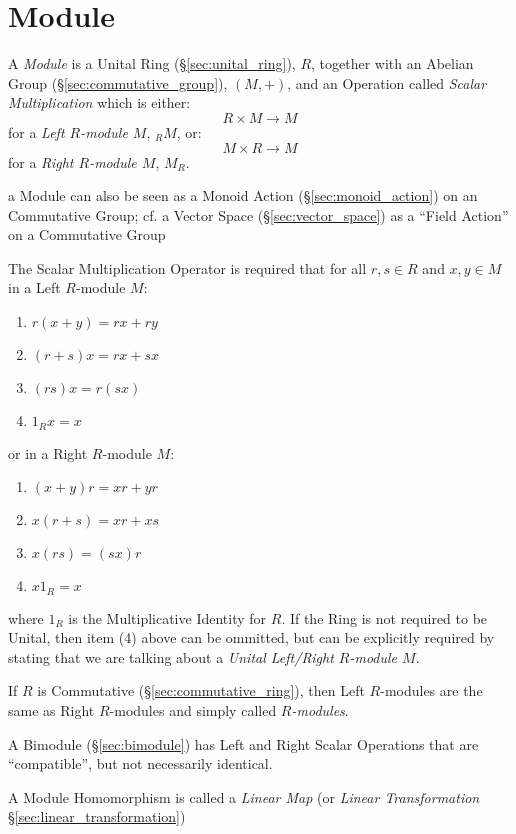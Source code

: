 \section{Module}\label{sec:module}

A \emph{Module} is a Unital Ring (\S\ref{sec:unital_ring}), $R$, together with
an Abelian Group (\S\ref{sec:commutative_group}), $(M, +)$, and an Operation
called \emph{Scalar Multiplication} which is either:
\[ R \times M \rightarrow M \]
for a \emph{Left $R$-module $M$}, $_R M$, or:
\[ M \times R \rightarrow M \]
for a \emph{Right $R$-module $M$}, $M_R$.

a Module can also be seen as a Monoid Action (\S\ref{sec:monoid_action}) on an
Commutative Group;
cf. a Vector Space (\S\ref{sec:vector_space}) as a ``Field Action'' on a
Commutative Group

The Scalar Multiplication Operator is required that for all $r,s \in R$ and
$x,y \in M$ in a Left $R$-module $M$:
\begin{enumerate}
    \item $r(x + y) = rx + ry$
    \item $(r + s)x = rx + sx$
    \item $(rs)x = r(sx)$
    \item $1_Rx = x$
\end{enumerate}
or in a Right $R$-module $M$:
\begin{enumerate}
    \item $(x + y)r = xr + yr$
    \item $x(r + s) = xr + xs$
    \item $x(rs) = (sx)r$
    \item $x 1_R = x$
\end{enumerate}
where $1_R$ is the Multiplicative Identity for $R$. If the Ring is not
required to be Unital, then item (4) above can be ommitted, but can be
explicitly required by stating that we are talking about a
\emph{Unital Left/Right $R$-module $M$}.

If $R$ is Commutative (\S\ref{sec:commutative_ring}), then Left $R$-modules are
the same as Right $R$-modules and simply called \emph{$R$-modules}.

A Bimodule (\S\ref{sec:bimodule}) has Left and Right Scalar Operations that are
``compatible'', but not necessarily identical.

A Module Homomorphism is called a \emph{Linear Map} (or \emph{Linear
  Transformation} \S\ref{sec:linear_transformation})

